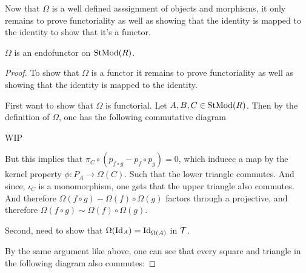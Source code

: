 Now that \( \Omega \) is a well defined asssignment of objects and morphisms, it only remains to prove functoriality as well as showing that the identity is mapped to the identity to show that it's a functor.

\begin{lemma}
    \( \Omega \) is an endofunctor on \( \operatorname{StMod}(R) \).
\end{lemma}
\begin{proof}
    To show that \( \Omega \) is a functor it remains to prove functoriality as well as showing that the identity is mapped to the identity.

    First want to show that \( \Omega \) is functorial. Let \( A, B, C \in \operatorname{StMod}(R) \). Then by the definition of \( \Omega \), one has the following commutative diagram
    \begin{center}
    \end{center}

    WIP

    But this implies that \( \pi_C \circ (p_{f \circ g} - p_f \circ p_g) = 0 \), which inducec a map by the kernel property \( \phi: P_A \to \Omega(C) \). Such that the lower triangle commutes. And since, \( \iota_C \) is a monomorphism, one gets that the upper triangle also commutes. And therefore \( \Omega(f \circ g) - \Omega(f) \circ \Omega(g) \) factors through a projective, and therefore \( \Omega(f \circ g) \sim \Omega(f) \circ \Omega(g) \).

    Second, need to show that \( \Omega(\operatorname{Id}_A) = \operatorname{Id}_{\Omega(A)} \) in \( {\mathcal{T}} \).

    By the same argument like above, one can see that every square and triangle in the following diagram also commutes:


\end{proof}

